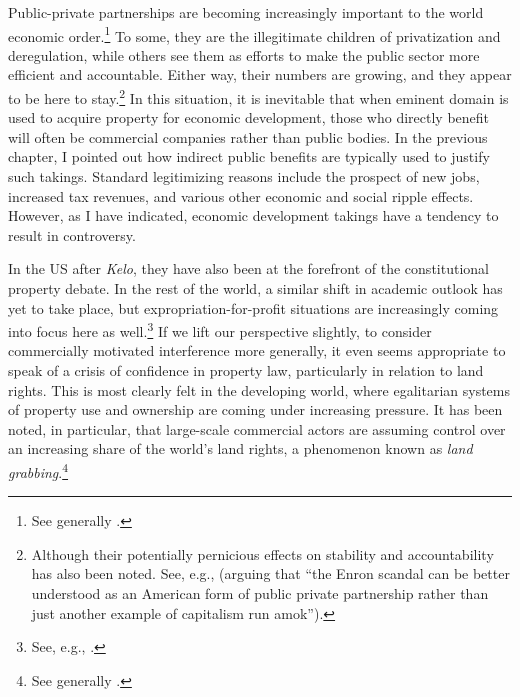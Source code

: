 \documentclass[12pt,a4paper]{book} %
\begin{document}
Public-private partnerships are becoming increasingly important to the world economic order.\footnote{See generally \cite{saussier13}.} To some, they are the illegitimate children of privatization and deregulation, while others see them as efforts to make the public sector more efficient and accountable. Either way, their numbers are growing, and they appear to be here to stay.\footnote{Although their potentially pernicious effects on stability and accountability has also been noted. See, e.g., \cite{baker03} (arguing that ``the Enron scandal can be better understood as an American form of public private partnership rather than just another example of capitalism run amok'').} In this situation, it is inevitable that when eminent domain is used to acquire property for economic development, those who directly benefit will often be commercial companies rather than public bodies. In the previous chapter, I pointed out how indirect public benefits are typically used to justify such takings. Standard legitimizing reasons include the prospect of new jobs, increased tax revenues, and various other economic and social ripple effects. However, as I have indicated, economic development takings have a tendency to result in controversy.

In the US after {\it Kelo}, they have also been at the forefront of the constitutional property debate. In the rest of the world, a similar shift in academic outlook has yet to take place, but expropriation-for-profit situations are increasingly coming into focus here as well.\footnote{See, e.g., \cite{gray11,waring13,verstappen14}.} If we lift our perspective slightly, to consider commercially motivated interference more generally, it even seems appropriate to speak of a crisis of confidence in property law, particularly in relation to land rights. This is most clearly felt in the developing world, where egalitarian systems of property use and ownership are coming under increasing pressure. It has been noted, in particular, that large-scale commercial actors are assuming control over an increasing share of the world's land rights, a phenomenon known as {\it land grabbing}.\footnote{See generally \cite{borras11}.} 
\end{document}

